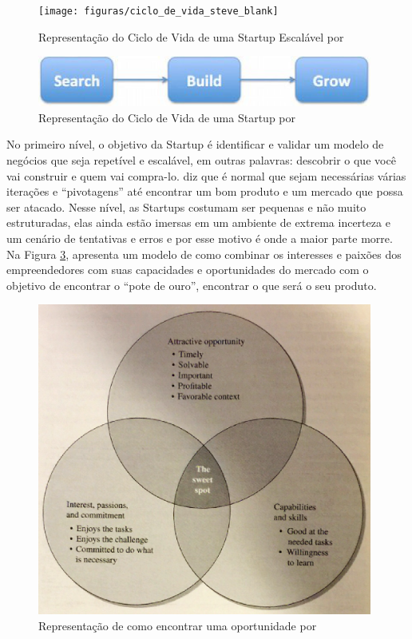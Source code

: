 \begin{figure}[!htb]
\centering
\texttt{[image: figuras/ciclo\_de\_vida\_steve\_blank]}
\caption{Representação do Ciclo de Vida de uma Startup Escalável por \cite{Blank2014}}
\label{figure:ciclo_de_vida_steve_blank}
\end{figure}

\begin{figure}[!htb]
\centering
\includegraphics[width=11cm,angle=0]{figuras/ciclo_de_vida_steve_blank02}
\caption{Representação do Ciclo de Vida de uma Startup por \cite{Blank2015}}
\label{figure:ciclo_de_vida_steve_blank_02}
\end{figure}

No primeiro nível, o objetivo da Startup é identificar e validar um modelo de negócios que seja repetível e escalável, em outras palavras: descobrir o que você vai construir e quem vai compra-lo.  diz que é normal que sejam necessárias várias iterações e ``pivotagens'' até encontrar um bom produto e um mercado que possa ser atacado. Nesse nível, as Startups costumam ser pequenas e não muito estruturadas, elas ainda estão imersas em um ambiente de extrema incerteza e um cenário de tentativas e erros e por esse motivo é onde a maior parte morre. Na Figura \ref{figure:the_sweet_spot_byers},  apresenta um modelo de como combinar os interesses e paixões dos empreendedores com suas capacidades e oportunidades do mercado com o objetivo de encontrar o ``pote de ouro'', encontrar o que será o seu produto. 

\begin{figure}[!htb]
\centering
\includegraphics[width=11cm,angle=0]{figuras/the_sweet_spot_byers}
\caption{Representação de como encontrar uma oportunidade por \cite{Byers2014}}
\label{figure:the_sweet_spot_byers}
\end{figure}

